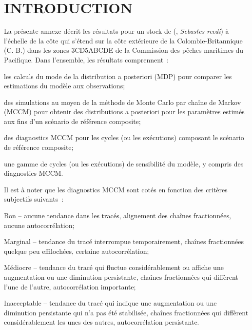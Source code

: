 \documentclass[11pt]{book}
\begin{document}
\section{INTRODUCTION}

La pr\'{e}sente annexe d\'{e}crit les r\'{e}sultats pour un stock de \SPP{} (\SPC, \emph{Sebastes reedi}) \`{a} l'\'{e}chelle de la c\^{o}te qui s'\'{e}tend sur la c\^{o}te ext\'{e}rieure de la Colombie-Britannique (C.-B.) dans les zones 3CD5ABCDE de la Commission des p\^{e}ches maritimes du Pacifique. 
Dans l'ensemble, les r\'{e}sultats comprennent~:
\begin{itemize_csas}{}{}
  \item les calculs du mode de la distribution a posteriori (MDP) pour comparer les estimations du mod\`{e}le aux observations; 
  \item des simulations au moyen de la m\'{e}thode de Monte Carlo par cha\^{i}ne de Markov (MCCM) pour obtenir des distributions a posteriori pour les param\`{e}tres estim\'{e}s aux fins d'un sc\'{e}nario de r\'{e}f\'{e}rence composite;
  \item des diagnostics MCCM pour les cycles (ou les ex\'{e}cutions) composant le sc\'{e}nario de r\'{e}f\'{e}rence composite;
  \item une gamme de cycles (ou les ex\'{e}cutions) de sensibilit\'{e} du mod\`{e}le, y compris des diagnostics MCCM.
\end{itemize_csas}
Il est \`{a} noter que les diagnostics MCCM sont cot\'{e}s en fonction des crit\`{e}res subjectifs suivants~:
\begin{itemize_csas}{}{}
  \item Bon -- aucune tendance dans les trac\'{e}s, alignement des cha\^{i}nes fractionn\'{e}es, aucune autocorr\'{e}lation;
  \item Marginal -- tendance du trac\'{e} interrompue temporairement, cha\^{i}nes fractionn\'{e}es quelque peu effiloch\'{e}es, certaine autocorr\'{e}lation;
  \item M\'{e}diocre -- tendance du trac\'{e} qui fluctue consid\'{e}rablement ou affiche une augmentation ou une diminution persistante, cha\^{i}nes fractionn\'{e}es qui diff\`{e}rent l'une de l'autre, autocorr\'{e}lation importante;
  \item Inacceptable -- tendance du trac\'{e} qui indique une augmentation ou une diminution persistante qui n'a pas \'{e}t\'{e} stabilis\'{e}e, cha\^{i}nes fractionn\'{e}es qui diff\`{e}rent consid\'{e}rablement les unes des autres, autocorr\'{e}lation persistante.
\end{itemize_csas}
\end{document}
